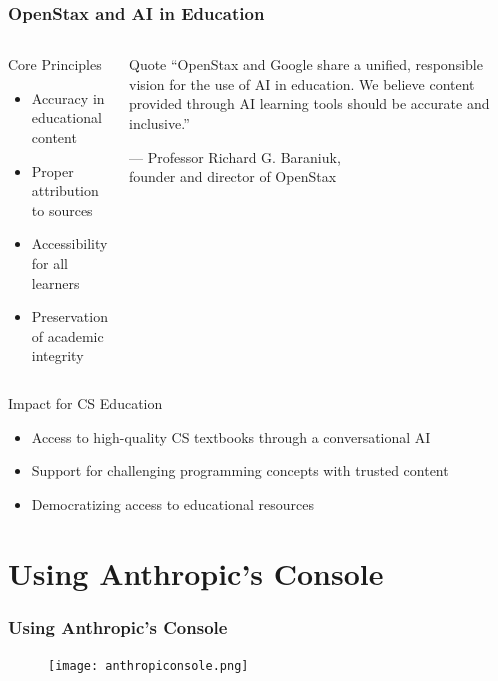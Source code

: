 \documentclass{beamer}
\begin{document}
\begin{frame}
\frametitle{OpenStax and AI in Education}

\begin{columns}
\begin{block}{Core Principles}
\begin{itemize}
\item Accuracy in educational content
\item Proper attribution to sources
\item Accessibility for all learners
\item Preservation of academic integrity
\end{itemize}
\end{block}

\begin{alertblock}{Quote}
\small ``OpenStax and Google share a unified, responsible vision for the use of AI in education. We believe content provided through AI learning tools should be accurate and inclusive.''
\begin{flushright}
\scriptsize — Professor Richard G. Baraniuk,\\founder and director of OpenStax
\end{flushright}
\end{alertblock}
\end{columns}

\vspace{0.5cm}
\begin{block}{Impact for CS Education}
\begin{itemize}
\item Access to high-quality CS textbooks through a conversational AI
\item Support for challenging programming concepts with trusted content
\item Democratizing access to educational resources
\end{itemize}
\end{block}
\end{frame}

\section{Using Anthropic's Console}
\frame{\sectionpage}

\begin{frame}
\frametitle{Using Anthropic's Console}
\begin{figure}
    \centering
    \texttt{[image: anthropiconsole.png]}
\end{figure}
\end{frame}
\end{document}
